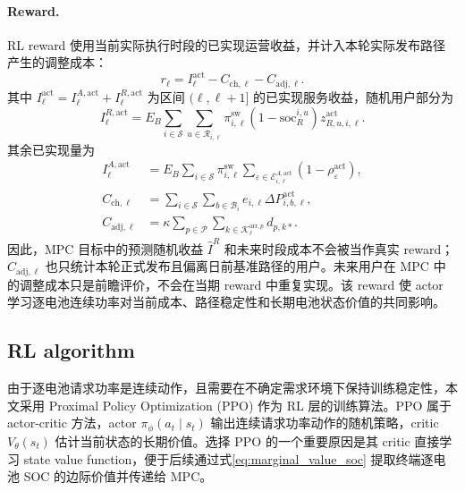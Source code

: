 \documentclass[12pt,a4paper,UTF8]{ctexart}
\begin{document}
\paragraph{Reward.}
RL reward 使用当前实际执行时段的已实现运营收益，并计入本轮实际发布路径产生的调整成本：
\begin{equation}
r_\ell
=
I_\ell^{\mathrm{act}}
-C_{\mathrm{ch},\ell}
-C_{\mathrm{adj},\ell}.
\label{eq:rl_reward}
\end{equation}
其中 $I_\ell^{\mathrm{act}}=I_\ell^{A,\mathrm{act}}+I_\ell^{R,\mathrm{act}}$ 为区间 $(\ell,\ell+1]$ 的已实现服务收益，随机用户部分为
\begin{equation}
I_\ell^{R,\mathrm{act}}
=E_B\sum_{i\in\mathcal S}
\sum_{u\in\mathcal R_{i,\ell}}
\pi_{i,\ell}^{\mathrm{sw}}
(1-\mathrm{soc}_R^{i,u})z_{R,u,i,\ell}^{\mathrm{act}}.
\label{eq:realized_random_income}
\end{equation}
其余已实现量为
\begin{align}
I_\ell^{A,\mathrm{act}}
&=E_B\sum_{i\in\mathcal S}\pi_{i,\ell}^{\mathrm{sw}}
\sum_{\varepsilon\in\mathcal E_{i,\ell}^{A,\mathrm{act}}}
(1-\rho_\varepsilon^{\mathrm{act}}),
\label{eq:realized_reservation_income}\\
C_{\mathrm{ch},\ell}
&=\sum_{i\in\mathcal S}\sum_{b\in\mathcal B_i}
e_{i,\ell}\Delta P_{i,b,\ell}^{\mathrm{act}},
\label{eq:realized_charging_cost}\\
C_{\mathrm{adj},\ell}
&=\kappa\sum_{p\in\mathcal P}
\sum_{k\in\mathcal K_\ell^{\mathrm{arr},p}}d_{p,k*}.
\label{eq:realized_adjustment_cost}
\end{align}
因此，MPC 目标中的预测随机收益 $\widehat I^R$ 和未来时段成本不会被当作真实 reward；$C_{\mathrm{adj},\ell}$ 也只统计本轮正式发布且偏离日前基准路径的用户。未来用户在 MPC 中的调整成本只是前瞻评价，不会在当期 reward 中重复实现。该 reward 使 actor 学习逐电池连续功率对当前成本、路径稳定性和长期电池状态价值的共同影响。


\subsection{RL algorithm}

由于逐电池请求功率是连续动作，且需要在不确定需求环境下保持训练稳定性，本文采用 Proximal Policy Optimization (PPO) 作为 RL 层的训练算法。PPO 属于 actor-critic 方法，actor $\pi_{\phi}(a_t\mid s_t)$ 输出连续请求功率动作的随机策略，critic $V_{\theta}(s_t)$ 估计当前状态的长期价值。选择 PPO 的一个重要原因是其 critic 直接学习 state value function，便于后续通过式\eqref{eq:marginal_value_soc} 提取终端逐电池 SOC 的边际价值并传递给 MPC。
\end{document}
